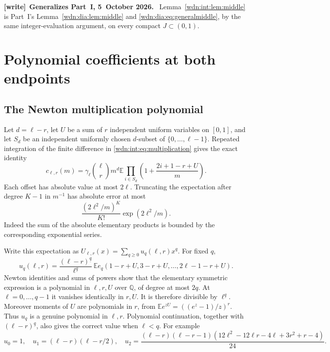 \documentclass[11pt,letterpaper]{article}
\theoremstyle{remark}\newtheorem{remark}[theorem]{Remark}
\newcommand{\fall}[2]{#1^{\underline{#2}}}
\newcommand{\Q}{\mathbb Q}
\newcommand{\E}{\mathbb E}
\newenvironment{writenote}[1][]{\par\smallskip\begingroup\small
 \noindent\textbf{[write]}\if\relax\detokenize{#1}\relax\else~\textbf{#1.}\fi\ }%
 {\par\endgroup\smallskip}
\begin{document}
\begin{writenote}[Generalizes Part~I, 5~October 2026]
Lemma~\ref{wdn:int:lem:middle} is Part~I's Lemma~\ref{wdn:dia:lem:middle} and \eqref{wdn:dia:eq:generalmiddle}, by the same integer-evaluation argument, on every compact $J\subset(0,1)$.
\end{writenote}

\section{Polynomial coefficients at both endpoints}\label{wdn:int:sec:endpoints}
\subsection{The Newton multiplication polynomial}
Let $d=\ell-r$, let $U$ be a sum of $r$ independent uniform variables
on $[0,1]$, and let $S_d$ be an independent uniformly chosen $d$-subset
of $\{0,\ldots,\ell-1\}$. Repeated integration of the finite difference
in \eqref{wdn:int:eq:multiplication} gives the exact identity
\begin{equation}\label{wdn:int:eq:Newtonintegral}
 c_{\ell,r}(m)=\gamma_\ell\binom\ell r m^d
 \E\prod_{i\in S_d}\left(1+\frac{2i+1-r+U}{m}\right).
\end{equation}
Each offset has absolute value at most $2\ell$. Truncating the expectation
after degree $K-1$ in $m^{-1}$ has absolute error at most
\begin{equation}\label{wdn:int:eq:productremainder}
 \frac{(2\ell^2/m)^K}{K!}\exp(2\ell^2/m).
\end{equation}
Indeed the sum of the absolute elementary products is bounded by the
corresponding exponential series.

Write this expectation as $U_{\ell,r}(x)=\sum_{q\ge0}u_q(\ell,r)x^q$.
For fixed $q$,
\begin{equation}\label{wdn:int:eq:u}
 u_q(\ell,r)=\frac{\fall{(\ell-r)}q}{\fall\ell q}\,
 \E e_q(1-r+U,3-r+U,\ldots,2\ell-1-r+U).
\end{equation}
Newton identities and sums of powers show that the elementary symmetric
expression is a polynomial in $\ell,r,U$ over $\Q$, of degree at most
$2q$. At $\ell=0,\ldots,q-1$ it vanishes identically in $r,U$.
It is therefore divisible by $\fall\ell q$. Moreover moments of $U$ are
polynomials in $r$, from
$\E e^{zU}=((e^z-1)/z)^r$. Thus $u_q$ is a genuine polynomial in
$\ell,r$. Polynomial continuation, together with $\fall{(\ell-r)}q$,
also gives the correct value when $\ell<q$. For example
\begin{equation}\label{wdn:int:eq:u12}
 u_0=1,\quad u_1=(\ell-r)(\ell-r/2),\quad
 u_2=\frac{(\ell-r)(\ell-r-1)(12\ell^2-12\ell r-4\ell+3r^2+r-4)}{24}.
\end{equation}
\end{document}
